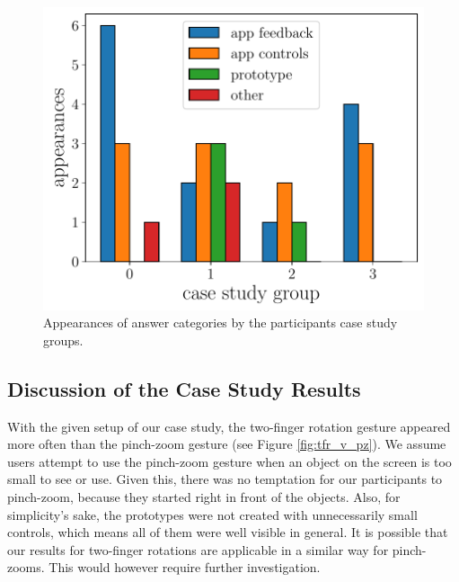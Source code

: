\documentclass[11pt, a4paper]{article}
\begin{document}
			\begin{figure}[H]
				\centering
				\includegraphics[width=.49\textwidth]{img/plot/plot_tags_implementations.pdf}
				\caption{Appearances of answer categories by the participants case study groups.}
				\label{fig:tags_imp}
			\end{figure}


		\subsection*{Discussion of the Case Study Results}\label{ssec:discussion}
			With the given setup of our case study, the two-finger rotation gesture appeared more often than the pinch-zoom gesture (see Figure \ref{fig:tfr_v_pz}). We assume users attempt to use the pinch-zoom gesture when an object on the screen is too small to see or use. Given this, there was no temptation for our participants to pinch-zoom, because they started right in front of the objects. Also, for simplicity's sake, the prototypes were not created with unnecessarily small controls, which means all of them were well visible in general. It is possible that our results for two-finger rotations are applicable in a similar way for pinch-zooms. This would however require further investigation.
\end{document}
